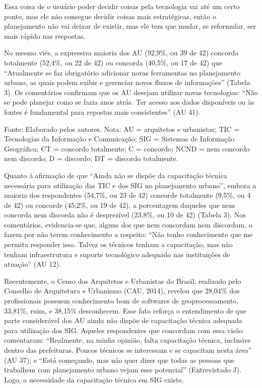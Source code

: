 \documentclass{article}
\begin{document}
\begin{multicols}{2}
Essa coisa de o usuário poder decidir coisas pela tecnologia vai até um certo
ponto, mas ele não consegue decidir coisas mais estratégicas, então o
planejamento não vai deixar de existir, mas ele tem que mudar, se
reformular, ser mais rápido nas respostas.

No mesmo viés, a expressiva maioria dos AU (92,9\%, ou 39 de 42) concorda
totalmente (52,4\%, ou 22 de 42) ou concorda (40,5\%, ou 17 de 42) que
“Atualmente se faz obrigatório adicionar novas ferramentas no
planejamento urbano, as quais podem exibir e gerenciar novos fluxos de
informações” (Tabela 3). Os
comentários confirmam que os AU desejam utilizar novas tecnologias: “Não
se pode planejar como se fazia anos atrás. Ter acesso aos dados disponíveis
ou às fontes é fundamental para repostas mais consistentes” (AU
41).

Fonte: Elaborado pelos autores. Nota: AU = arquitetos e urbanistas;
TIC = Tecnologias da Informação e Comunicação; SIG = Sistemas de
Informação Geográfica; CT = concordo totalmente; C = concordo; NCND
= nem concordo nem discordo; D = discordo; DT = discordo
totalmente.

Quanto à afirmação de que “Ainda não se dispõe da capacitação técnica
necessária para utilização das TIC e dos SIG no planejamento
urbano”, embora a maioria dos respondentes (54,7\%, ou 23 de 42)
concorde totalmente (9,5\%, ou 4 de 42) ou concorde (45,2\%, ou 19 de 42), a
porcentagem daqueles que nem concorda nem discorda não é desprezível (23,8\%, ou
10 de 42) (Tabela 3). Nos comentários,
evidencia-se que, alguns dos que nem concordam nem discordam, o fazem por não
terem conhecimento a respeito: “Não tenho conhecimento que me permita
responder isso. Talvez os técnicos tenham a capacitação, mas não tenham
infraestrutura e suporte tecnológico adequado nas instituições de
atuação” (AU 12).

Recentemente, o Censo dos Arquitetos e Urbanistas do Brasil, realizado pelo
Conselho de Arquitetura e Urbanismo (CAU,
2014), revelou que 28,04\% dos profissionais possuem conhecimento bom
de softwares de geoprocessamento, 33,81\%, ruim, e 38,15\%
desconhecem. Esse fato reforça o entendimento de que parte considerável dos AU
ainda não dispõe de capacitação técnica adequada para utilização dos SIG.
Aqueles respondentes que concordam com essa visão comentaram:
“Realmente, na minha opinião, falta capacitação técnica, inclusive
dentro das prefeituras. Poucos técnicos se interessam e se capacitam nesta
área” (AU 37); e “Está começando, mas não quer dizer que
todas as pessoas que trabalhem com planejamento urbano vejam esse
potencial” (Entrevistado J). Logo, a necessidade da capacitação
técnica em SIG existe.


\end{multicols}
\end{document}
